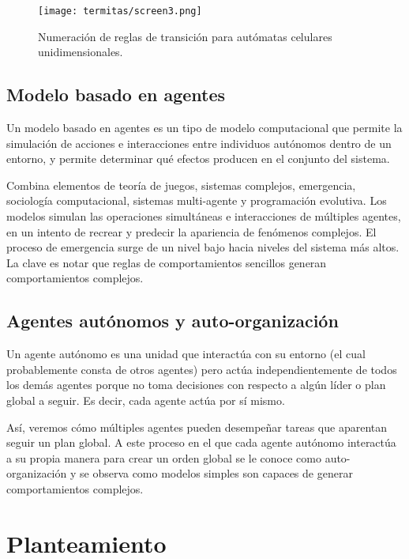 \begin{figure}
  \centering
  \texttt{[image: termitas/screen3.png]}
  \caption{Numeración de reglas de transición para autómatas celulares unidimensionales.}
  \label{fig:numtrans}
\end{figure}

\subsection{Modelo basado en agentes}
Un modelo basado en agentes es un tipo de modelo computacional que permite la simulación de acciones e interacciones entre individuos autónomos dentro de un entorno, y permite determinar qué efectos producen en el conjunto del sistema.\par

Combina elementos de teoría de juegos, sistemas complejos, emergencia, sociología computacional, sistemas multi-agente y programación evolutiva.
Los modelos simulan las operaciones simultáneas e interacciones de múltiples agentes, en un intento de recrear y predecir la apariencia de fenómenos complejos. El proceso de emergencia surge de un nivel bajo hacia niveles del sistema más altos. La clave es notar que reglas de comportamientos sencillos generan comportamientos complejos.\par

\subsection{Agentes aut\'onomos y auto-organizaci\'on}
Un agente autónomo es una unidad que interactúa con su entorno (el cual probablemente consta de otros agentes) pero actúa independientemente de todos los demás agentes porque no toma decisiones con respecto a algún líder o plan global a seguir. Es decir, cada agente actúa por sí mismo.\par

Así, veremos cómo múltiples agentes pueden desempeñar tareas que aparentan seguir un plan global. A este proceso en el que cada agente autónomo interactúa a su propia manera para crear un orden global se le conoce como auto-organización y se observa como modelos simples son capaces de generar comportamientos complejos.\par

\section{Planteamiento}

